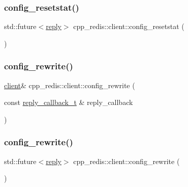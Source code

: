 \mbox{\label{classcpp__redis_1_1client_a775508ce5220546e46b573f95d2bcb4d}} 
\subsubsection{\texorpdfstring{config\+\_\+resetstat()}{config\_resetstat()}\hspace{0.1cm}{\footnotesize\ttfamily [2/2]}}
{\footnotesize\ttfamily std\+::future$<$\hyperlink{classcpp__redis_1_1reply}{reply}$>$ cpp\+\_\+redis\+::client\+::config\+\_\+resetstat (\begin{DoxyParamCaption}{ }\end{DoxyParamCaption})}

\mbox{\label{classcpp__redis_1_1client_a8dcf862a8a0cb75f8cc986445eae81cf}} 
\subsubsection{\texorpdfstring{config\+\_\+rewrite()}{config\_rewrite()}\hspace{0.1cm}{\footnotesize\ttfamily [1/2]}}
{\footnotesize\ttfamily \hyperlink{classcpp__redis_1_1client}{client}\& cpp\+\_\+redis\+::client\+::config\+\_\+rewrite (\begin{DoxyParamCaption}\item[{const \hyperlink{classcpp__redis_1_1client_a061a1140d36d2eaeda82b09a0bb3f9f2}{reply\+\_\+callback\+\_\+t} \&}]{reply\+\_\+callback }\end{DoxyParamCaption})}

\mbox{\label{classcpp__redis_1_1client_a1a001663bd555abb70521924ec2a27f8}} 
\subsubsection{\texorpdfstring{config\+\_\+rewrite()}{config\_rewrite()}\hspace{0.1cm}{\footnotesize\ttfamily [2/2]}}
{\footnotesize\ttfamily std\+::future$<$\hyperlink{classcpp__redis_1_1reply}{reply}$>$ cpp\+\_\+redis\+::client\+::config\+\_\+rewrite (\begin{DoxyParamCaption}{ }\end{DoxyParamCaption})}


